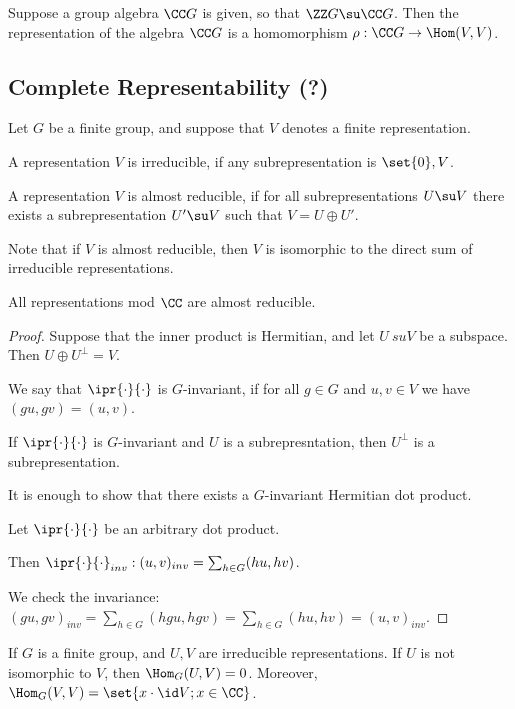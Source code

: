 \documentclass[11pt]{scrartcl}
\begin{document}
  Suppose a group algebra $\CC G$ is given, so that $\ZZ G \su \CC G$.
  Then the representation of the algebra $\CC G$ is a homomorphism
  $\rho: \CC G \to \Hom(V, V)$.

  \subsection{Complete Representability (?)}

  Let $G$ be a finite group, and suppose that $V$ denotes a finite
  representation.

  A representation $V$ is irreducible, if any subrepresentation is
  $\set{0}, V$.

  A representation $V$ is almost reducible, if for all
  subrepresentations $U\su V$ there exists a subrepresentation
  $U'\su V$ such that $V = U\oplus U'$.

  Note that if $V$ is almost reducible, then $V$ is isomorphic to the
  direct sum of irreducible representations.

  \begin{theorem}
    All representations mod $\CC$ are almost reducible.
  \end{theorem}

  \begin{proof}
    \hfill

    Suppose that the inner product is Hermitian, and let $U\ su V$
    be a subspace. Then $U \oplus U^{\perp} = V$.

    We say that $\ipr{\cdot}{\cdot}$ is $G$-invariant, if for all
    $g\in G$ and $u, v \in V$ we have $(gu, gv) = (u, v)$.

    If $\ipr{\cdot}{\cdot}$ is $G$-invariant and $U$ is a
    subrepresntation, then $U^{\perp}$ is a subrepresentation.

    It is enough to show that there exists a $G$-invariant Hermitian
    dot product.

    Let $\ipr{\cdot}{\cdot}$ be an arbitrary dot product.

    Then
    $\ipr{\cdot}{\cdot}_{inv}: (u, v)_{inv} = \sum_{h\in G}(hu, hv)$.

    We check the invariance: $(gu, gv)_{inv} = \sum_{h\in G}(hgu, hgv) = \sum_{h\in G}(hu, hv) = (u, v)_{inv}$.
    
  \end{proof}

  \begin{lemma}
    If $G$ is a finite group, and $U, V$ are irreducible
    representations. If $U$ is not isomorphic to $V$, then
    $\Hom_{G}(U, V) = 0$. Moreover,
    $\Hom_{G}(V,V) = \set{x \cdot \id V; x\in \CC}$.
  \end{lemma}
\end{document}
